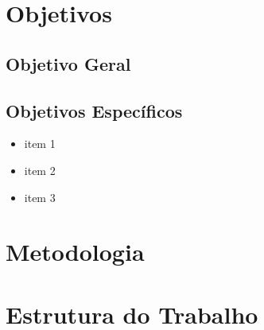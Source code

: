 \section{Objetivos}

\subsection{Objetivo Geral}


\subsection{Objetivos Específicos}
\begin{itemize}
\item item 1
\item item 2
\item item 3
\end{itemize}

\section{Metodologia}


\section{Estrutura do Trabalho}

